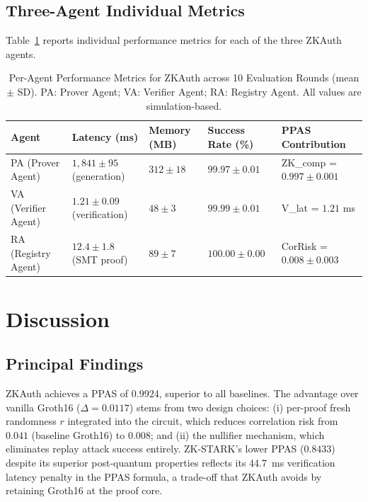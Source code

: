 \documentclass[journal,12pt,onecolumn]{IEEEtran}
\begin{document}
\subsection{Three-Agent Individual Metrics}

Table~\ref{tab:agent_metrics} reports individual performance metrics for
each of the three ZKAuth agents.

\begin{table}[t]
\caption{Per-Agent Performance Metrics for ZKAuth across 10 Evaluation
Rounds (mean $\pm$ SD). PA: Prover Agent; VA: Verifier Agent; RA:
Registry Agent. All values are simulation-based.}
\label{tab:agent_metrics}
\begin{tabularx}{\textwidth}{l X X X X}
\toprule
\textbf{Agent} & \textbf{Latency (ms)} & \textbf{Memory (MB)}
  & \textbf{Success Rate (\%)} & \textbf{PPAS Contribution} \\
\midrule
PA (Prover Agent)
  & $1{,}841 \pm 95$ (generation) & $312 \pm 18$ & $99.97 \pm 0.01$ & ZK\_comp = $0.997 \pm 0.001$ \\
VA (Verifier Agent)
  & $1.21 \pm 0.09$ (verification) & $48 \pm 3$ & $99.99 \pm 0.01$ & V\_lat = $1.21$ ms \\
RA (Registry Agent)
  & $12.4 \pm 1.8$ (SMT proof) & $89 \pm 7$ & $100.00 \pm 0.00$ & CorRisk = $0.008 \pm 0.003$ \\
\bottomrule
\end{tabularx}
\end{table}

\section{Discussion}
\label{sec:discussion}

\subsection{Principal Findings}

ZKAuth achieves a PPAS of $0.9924$, superior to all baselines. The
advantage over vanilla Groth16 ($\Delta = 0.0117$) stems from two
design choices: (i) per-proof fresh randomness $r$ integrated into the
circuit, which reduces correlation risk from $0.041$ (baseline Groth16)
to $0.008$; and (ii) the nullifier mechanism, which eliminates replay
attack success entirely. ZK-STARK's lower PPAS ($0.8433$) despite its
superior post-quantum properties reflects its 44.7~ms verification
latency penalty in the PPAS formula, a trade-off that ZKAuth avoids
by retaining Groth16 at the proof core.
\end{document}
